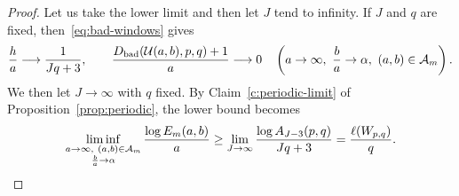 \begin{proof}
Let us take the lower limit and then let $J$ tend to infinity.
If $J$ and $q$ are fixed, then~\eqref{eq:bad-windows} gives
\[
 \frac{h}{a}\longrightarrow\frac1{Jq+3},\qquad
 \frac{D_{\mathrm{bad}}(\mathcal U(a,b),p,q)+1}{a}\longrightarrow0
 \quad\left(a\to\infty,\ \frac ba\to\alpha,\ (a,b)\in\cA_m\right).
\]
We then let $J\to\infty$ with $q$ fixed. By Claim~\ref{c:periodic-limit} of Proposition~\ref{prop:periodic}, the lower bound becomes
\[
 \liminf_{\substack{a\to\infty,\ (a,b)\in\cA_m\\\frac{b}{a}\to\alpha}}
 \frac{\log E_m(a,b)}a
 \ge\lim_{J\to\infty}\frac{\log A_{J-3}(p,q)}{Jq+3}
 =\frac{\ell(W_{p,q})}q.
\]
\end{proof}

